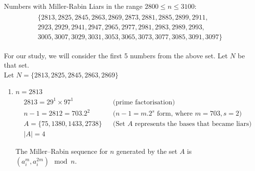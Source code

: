 \documentclass[11pt,a4paper]{article}
\begin{document}
\begin{enumerate}[1.]
\begin{enumerate}[3.]
\begin{flushleft}
			\medskip
			Numbers with Miller-Rabin Liars in the range $2800 \le n \le 3100$:
			\begin{align}
				\begin{split}
				&\{2813, 2825, 2845, 2863, 2869, 2873, 2881, 2885, 2899, 2911, \\
				&2923, 2929, 2941, 2947, 2965, 2977, 2981, 2983, 2989, 2993, \\ 
				&3005, 3007, 3029, 3031, 3053, 3065, 3073, 3077, 3085, 3091,3097\}
				\end{split}
			\end{align}
			
			For our study, we will consider the first 5 numbers from the above set. Let $N$ be that set.\\
			Let $N = \{2813, 2825, 2845, 2863, 2869\}$
			
			\begin{enumerate}[1.]
				\item $n = 2813$ 
				\begin{align}
					& 2813 = 29^1 \times 97^1 &&\text{(prime factorisation)}\nonumber\\
					& n - 1 = 2812 = 703.2^2 &&\text{($n - 1 = m.2^s$ form, where $m = 703, s = 2$)}\nonumber\\
					& A = \{75, 1380, 1433, 2738\}&&\text{(Set $A$ represents the bases that became liars)} \nonumber\\
					& |A| = 4 \nonumber
				\end{align}
				
				The Miller–Rabin sequence for $n$ generated by the set $A$ is $(a_i^m,a_i^{2m})\mod n$. 
				

\end{enumerate}
\end{flushleft}
\end{enumerate}
\end{enumerate}
\end{document}
